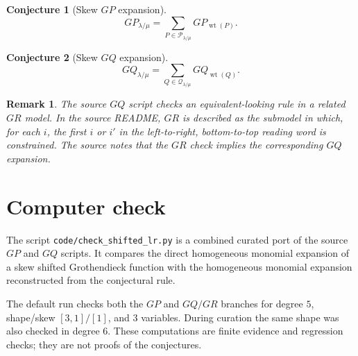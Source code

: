 \documentclass{article}
\newtheorem{conjecture}{Conjecture}
\newtheorem{remark}{Remark}
\begin{document}
\begin{conjecture}[Skew \(GP\) expansion]
\[
  GP_{\lambda/\mu}
  =
  \sum_{P\in\mathcal{P}_{\lambda/\mu}} GP_{\operatorname{wt}(P)}.
\]
\end{conjecture}

\begin{conjecture}[Skew \(GQ\) expansion]
\[
  GQ_{\lambda/\mu}
  =
  \sum_{Q\in\mathcal{Q}_{\lambda/\mu}} GQ_{\operatorname{wt}(Q)}.
\]
\end{conjecture}

\begin{remark}
The source \(GQ\) script checks an equivalent-looking rule in a related \(GR\)
model.  In the source README, \(GR\) is described as the submodel in which, for
each \(i\), the first \(i\) or \(i'\) in the left-to-right, bottom-to-top
reading word is constrained.  The source notes that the \(GR\) check implies
the corresponding \(GQ\) expansion.
\end{remark}

\section{Computer check}

The script \texttt{code/check\_shifted\_lr.py} is a combined curated port of
the source \(GP\) and \(GQ\) scripts.  It compares the direct homogeneous
monomial expansion of a skew shifted Grothendieck function with the homogeneous
monomial expansion reconstructed from the conjectural rule.

The default run checks both the \(GP\) and \(GQ/GR\) branches for degree \(5\),
shape/skew \([3,1]/[1]\), and \(3\) variables.  During curation the same shape
was also checked in degree \(6\).  These computations are finite evidence and
regression checks; they are not proofs of the conjectures.
\end{document}
